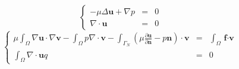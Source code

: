 \documentclass{article}
\begin{document}
$$
\left\{
\begin{array}{rcl}
	-\mu\Delta\textbf{u} + \nabla p &=& 0\\
	\nabla\cdot\textbf{u} &=& 0
\end{array}
\right.
$$
$$
\left\{
\begin{array}{rcl}
	  \mu\int_{\Omega}{\nabla\textbf{u}\cdot\nabla\textbf{v}}
	- \int_{\Omega}{p\nabla\cdot\textbf{v}}
	- \int_{\Gamma_N}{\left(\mu\frac{\partial\textbf{u}}{\partial\textbf{n}} - p\textbf{n}\right) \cdot \textbf{v}}
	&=&	\int_{\Omega}{\textbf{f} \cdot \textbf{v}}\\
	\int_{\Omega}{\nabla\cdot\textbf{u}q} &=& 0
\end{array}
\right.
$$
\end{document}
